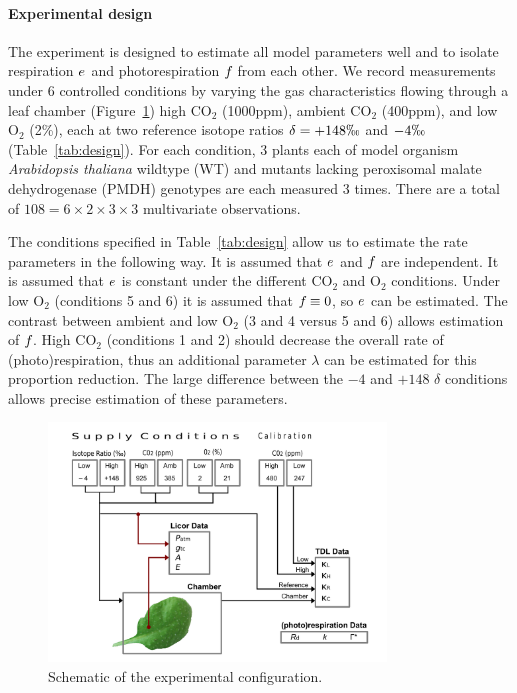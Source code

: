 \paragraph{Experimental design}

The experiment is designed to estimate all model parameters well
  and to isolate respiration $e_{}$ and photorespiration $f_{}$ from each other.
We record measurements under 6 controlled conditions
  by varying the gas characteristics flowing through a leaf chamber (Figure~\ref{fi:tdl})
  high CO$_2$ (1000ppm), ambient CO$_2$ (400ppm), and low O$_2$ (2\%),
  each at two reference isotope ratios $\delta=+148\permil$ and $-4\permil$ (Table~\ref{tab:design}).
For each condition, 3 plants each of model organism
  {\em Arabidopsis thaliana} wildtype (WT) and
  mutants lacking peroxisomal malate dehydrogenase (PMDH)
  genotypes
  are each measured 3 times.
There are a total of $108=6\times 2\times 3\times 3$ multivariate observations.

The conditions specified in Table~\ref{tab:design} allow us to estimate the rate parameters in the following way.
It is assumed that $e_{}$ and $f_{}$ are independent.
It is assumed that $e_{}$ is constant under the different CO$_2$ and O$_2$ conditions.
Under low O$_2$ (conditions 5 and 6) it is assumed that $f_{}\equiv 0$, so $e_{}$ can be estimated.
The contrast between ambient and low O$_2$ (3 and 4 versus 5 and 6) allows estimation of $f_{}$.
High CO$_2$ (conditions 1 and 2) should decrease the overall rate of (photo)respiration,
  thus an additional parameter $\lambda$ can be estimated for this proportion reduction.
The large difference between the $-4$ and $+148$ $\delta$ conditions allows precise estimation
  of these parameters.


 \begin{figure}[!hbtp]
\begin{center}
\includegraphics[width=0.8\textwidth]{Schematic_TDL-Licor2}
\caption{
  Schematic of the experimental configuration.
  }
\label{fi:tdl}
\end{center}
 \end{figure}

